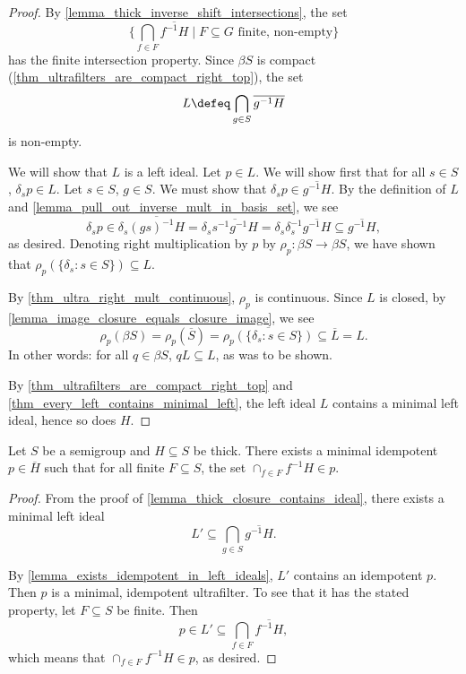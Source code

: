 \begin{proof}
    By \cref{lemma_thick_inverse_shift_intersections}, the set
    \[\big\{ \bigcap_{f \in F} \overline{f^{-1} H} \mid F \subseteq G \text{ finite, non-empty}\big\}\]
    has the finite intersection property.  Since $\beta S$ is compact (\cref{thm_ultrafilters_are_compact_right_top}), the set
    \[L \defeq \bigcap_{g \in S} \overline{g^{-1}H}\]
    is non-empty.
    
    We will show that $L$ is a left ideal.  Let $p \in L$.  We will show first that for all $s \in S$, $\delta_s p \in L$.  Let $s \in S$, $g \in S$. We must show that $\delta_s p \in \overline{g^{-1} H}$.  By the definition of $L$ and \cref{lemma_pull_out_inverse_mult_in_basis_set}, we see
    \[\delta_sp \in \delta_s \overline{(gs)^{-1} H} = \delta_s \overline{s^{-1}g^{-1} H} = \delta_s \delta_s^{-1} \overline{g^{-1} H} \subseteq \overline{g^{-1} H},\]
    as desired.  Denoting right multiplication by $p$ by $\rho_p: \beta S \to \beta S$, we have shown that $\rho_p(\{\delta_s : s \in S\}) \subseteq L$.

    By \cref{thm_ultra_right_mult_continuous}, $\rho_p$ is continuous.  Since $L$ is closed, by \cref{lemma_image_closure_equals_closure_image}, we see
    \[\rho_p(\beta S) = \rho_p(\overline{S}) = \overline{\rho_p(\{\delta_s : s \in S\})} \subseteq \overline{L} = L.\]
    In other words: for all $q \in \beta S$, $qL \subseteq L$, as was to be shown.
    
    By \cref{thm_ultrafilters_are_compact_right_top} and \cref{thm_every_left_contains_minimal_left}, the left ideal $L$ contains a minimal left ideal, hence so does $H$.
\end{proof}

\begin{lemma}
    \label{lemma_thick_closure_contains_strong_ultrafilter}
    \leanok{}
    Let $S$ be a semigroup and $H \subseteq S$ be thick. There exists a minimal idempotent $p \in \overline{H}$ such that for all finite $F \subseteq S$, the set $\cap_{f \in F} f^{-1} H \in p$.
\end{lemma}

\begin{proof}
    From the proof of \cref{lemma_thick_closure_contains_ideal}, there exists a minimal left ideal
    \[L' \subseteq \bigcap_{g \in S} \overline{g^{-1}H}.\]

    By \cref{lemma_exists_idempotent_in_left_ideals}, $L'$ contains an idempotent $p$.  Then $p$ is a minimal, idempotent ultrafilter.  To see that it has the stated property, let $F \subseteq S$ be finite.  Then
    \[p \in L' \subseteq \bigcap_{f \in F} \overline{f^{-1} H},\]
    which means that $\cap_{f \in F} f^{-1} H \in p$, as desired.
\end{proof}

